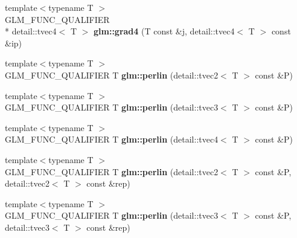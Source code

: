 \begin{DoxyCompactItemize}
\item 
\hypertarget{namespaceglm_a4eecacbc10511bc5eacd3415edee9e23}{{\footnotesize template$<$typename T $>$ }\\G\-L\-M\-\_\-\-F\-U\-N\-C\-\_\-\-Q\-U\-A\-L\-I\-F\-I\-E\-R \\*
detail\-::tvec4$<$ T $>$ {\bfseries glm\-::grad4} (T const \&j, detail\-::tvec4$<$ T $>$ const \&ip)}\label{namespaceglm_a4eecacbc10511bc5eacd3415edee9e23}

\item 
\hypertarget{namespaceglm_a188c12ac107a55a290ba62ef1c44e3b3}{{\footnotesize template$<$typename T $>$ }\\G\-L\-M\-\_\-\-F\-U\-N\-C\-\_\-\-Q\-U\-A\-L\-I\-F\-I\-E\-R T {\bfseries glm\-::perlin} (detail\-::tvec2$<$ T $>$ const \&P)}\label{namespaceglm_a188c12ac107a55a290ba62ef1c44e3b3}

\item 
\hypertarget{namespaceglm_a7543f2468bf634c1dc5e867e8af3473c}{{\footnotesize template$<$typename T $>$ }\\G\-L\-M\-\_\-\-F\-U\-N\-C\-\_\-\-Q\-U\-A\-L\-I\-F\-I\-E\-R T {\bfseries glm\-::perlin} (detail\-::tvec3$<$ T $>$ const \&P)}\label{namespaceglm_a7543f2468bf634c1dc5e867e8af3473c}

\item 
\hypertarget{namespaceglm_a102263cd9bf82863416bce448093cf86}{{\footnotesize template$<$typename T $>$ }\\G\-L\-M\-\_\-\-F\-U\-N\-C\-\_\-\-Q\-U\-A\-L\-I\-F\-I\-E\-R T {\bfseries glm\-::perlin} (detail\-::tvec4$<$ T $>$ const \&P)}\label{namespaceglm_a102263cd9bf82863416bce448093cf86}

\item 
\hypertarget{namespaceglm_a1d307243dc065498ef4f4cdffaee61e2}{{\footnotesize template$<$typename T $>$ }\\G\-L\-M\-\_\-\-F\-U\-N\-C\-\_\-\-Q\-U\-A\-L\-I\-F\-I\-E\-R T {\bfseries glm\-::perlin} (detail\-::tvec2$<$ T $>$ const \&P, detail\-::tvec2$<$ T $>$ const \&rep)}\label{namespaceglm_a1d307243dc065498ef4f4cdffaee61e2}

\item 
\hypertarget{namespaceglm_a0b19062029abc152b036085b5d9621cb}{{\footnotesize template$<$typename T $>$ }\\G\-L\-M\-\_\-\-F\-U\-N\-C\-\_\-\-Q\-U\-A\-L\-I\-F\-I\-E\-R T {\bfseries glm\-::perlin} (detail\-::tvec3$<$ T $>$ const \&P, detail\-::tvec3$<$ T $>$ const \&rep)}\label{namespaceglm_a0b19062029abc152b036085b5d9621cb}


\end{DoxyCompactItemize}
